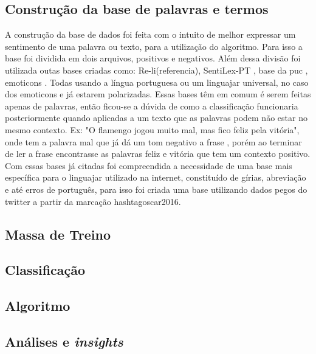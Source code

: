 \subsection{Construção da base de palavras e termos}
A construção da base de dados foi feita com o intuito de melhor expressar um sentimento de uma palavra ou texto, para a utilização do algoritmo. Para isso a base foi dividida em dois arquivos, positivos e negativos. Além dessa divisão foi utilizada outas bases criadas como: Re-li(referencia), SentiLex-PT \cite{marioj.silvapaulacarvalholuissarmento2012}, base da puc \cite{freitas2013construccao}, emoticons \cite{alexanderhogenboomdaniellabalflaviusfrasincarmalissabalfranciskadejonguzaykaymak}. Todas usando a língua portuguesa ou um linguajar universal, no caso dos emoticons e já estarem polarizadas. Essas bases têm em comum é serem feitas apenas de palavras, então ficou-se a dúvida de como a classificação funcionaria posteriormente quando aplicadas a um texto que as palavras podem não estar no mesmo contexto. Ex: "O flamengo jogou muito mal, mas fico feliz pela vitória", onde tem a palavra mal que já dá um tom negativo a frase , porém ao terminar de ler a frase encontrasse as palavras feliz e vitória que tem um contexto positivo.
Com essas bases já citadas foi compreendida a necessidade de uma base mais específica para o linguajar utilizado na internet, constituído de  
gírias, abreviação e até erros de português, para isso foi criada uma base utilizando dados pegos do twitter a partir da marcação hashtagoscar2016.

\subsection{Massa de Treino}

\subsection{Classificação}

\subsection{Algoritmo}

\subsection{Análises e \textit{insights}}